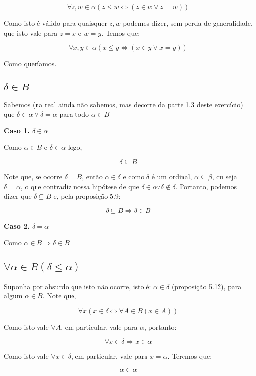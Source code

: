 \documentclass[12pt]{extarticle}
\begin{document}
$$
\forall z,w \in \alpha (z \leq w \Leftrightarrow (z \in w \lor z = w))
$$

Como isto é válido para quaisquer $z,w$ podemos dizer, sem perda de generalidade, que isto vale para $z = x$ e $w = y$. Temos que:

$$
\forall x,y \in \alpha (x \leq y \Leftrightarrow (x \in y \lor x = y))
$$

Como queríamos.

\subsection{$\delta \in B$}

Sabemos (na real ainda não sabemos, mas decorre da parte 1.3 deste exercício) que $\delta \in \alpha \lor \delta = \alpha$ para todo $\alpha \in B$. 

\textbf{Caso 1. $\delta \in \alpha$}

Como $\alpha \in B$ e $\delta \in \alpha$ logo,

$$
\delta \subseteq B
$$

Note que, se ocorre $\delta = B$, então $\alpha \in \delta$ e como $\delta$ é um ordinal, $\alpha \subseteq \beta$, ou seja $\delta = \alpha$, o que contradiz nossa hipótese de que $\delta \in \alpha \because \delta \notin \delta$. Portanto, podemos dizer que $\delta \subsetneq B$ e, pela proposição 5.9:

$$
\delta \subsetneq B \Rightarrow \delta \in B
$$

\textbf{Caso 2. $\delta = \alpha$}

Como $\alpha \in B \Rightarrow \delta \in B$ 

\subsection{$\forall \alpha \in B (\delta \leq \alpha)$}

Suponha por absurdo que isto não ocorre, isto é: $\alpha \in \delta$ (proposição 5.12), para algum $\alpha \in B$. Note que,

$$
\forall x (x \in \delta \Leftrightarrow \forall A \in B (x \in A))
$$

Como isto vale $\forall A$, em particular, vale para $\alpha$, portanto:

$$
\forall x \in \delta \Rightarrow x \in \alpha
$$

Como isto vale $\forall x \in \delta$, em particular, vale para $x = \alpha$. Teremos que:

$$
\alpha \in \alpha
$$
\end{document}
